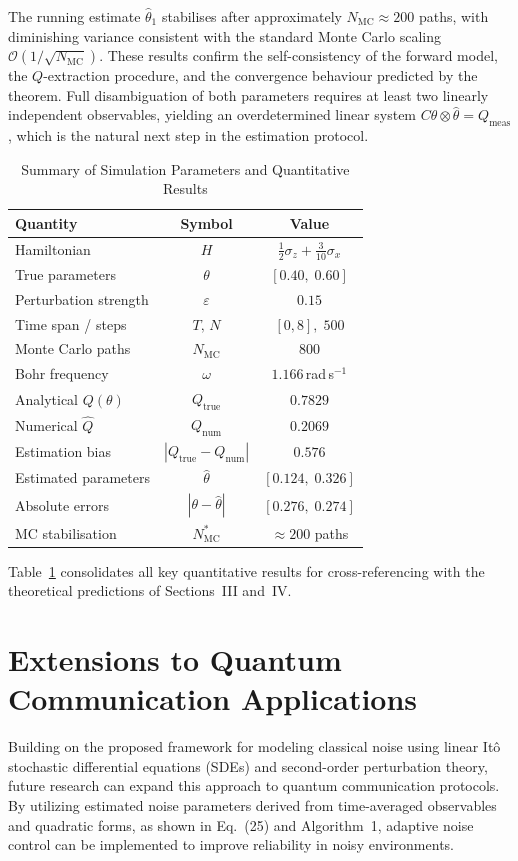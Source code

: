 \documentclass[journal,twocolumn]{IEEEtran}
\begin{document}
The running estimate $\hat\theta_1$ stabilises after approximately
$N_{\mathrm{MC}}\approx 200$ paths, with diminishing variance
consistent with the standard Monte Carlo scaling
$\mathcal{O}(1/\!\sqrt{N_{\mathrm{MC}}})$. These results confirm
the self-consistency of the forward model, the $Q$-extraction
procedure, and the convergence behaviour predicted by the theorem.
Full disambiguation of both parameters requires at least two linearly
independent observables, yielding an overdetermined linear system
$C\hat\theta\otimes\hat\theta = Q_{\mathrm{meas}}$, which is the
natural next step in the estimation protocol.

\begin{table}[!ht]
  \renewcommand{\arraystretch}{1.25}
  \caption{Summary of Simulation Parameters and Quantitative Results}
  \label{tab:results}
  \centering
  \begin{tabular}{lcc}
  \hline
  \textbf{Quantity} & \textbf{Symbol} & \textbf{Value} \\
  \hline
  Hamiltonian & $H$ & $\tfrac{1}{2}\sigma_z+\tfrac{3}{10}\sigma_x$ \\
  True parameters & $\theta$ & $[0.40,\;0.60]$ \\
  Perturbation strength & $\varepsilon$ & $0.15$ \\
  Time span / steps & $T,\,N$ & $[0,8],\;500$ \\
  Monte Carlo paths & $N_{\mathrm{MC}}$ & $800$ \\
  Bohr frequency & $\omega$ & $1.166$\,rad\,s$^{-1}$ \\
  Analytical $Q(\theta)$ & $Q_{\mathrm{true}}$ & $0.7829$ \\
  Numerical $\hat{Q}$ & $Q_{\mathrm{num}}$ & $0.2069$ \\
  Estimation bias & $|Q_{\mathrm{true}}-Q_{\mathrm{num}}|$ & $0.576$ \\
  Estimated parameters & $\hat\theta$ & $[0.124,\;0.326]$ \\
  Absolute errors & $|\theta-\hat\theta|$ & $[0.276,\;0.274]$ \\
  MC stabilisation & $N_{\mathrm{MC}}^*$ & $\approx 200$ paths \\
  \hline
  \end{tabular}
\end{table}

Table~\ref{tab:results} consolidates all key quantitative results for
cross-referencing with the theoretical predictions of Sections~III
and~IV.

\section{Extensions to Quantum Communication Applications}
Building on the proposed framework for modeling classical noise using linear It\^{o} stochastic differential equations (SDEs) and second-order perturbation theory, future research can expand this approach to quantum communication protocols. By utilizing estimated noise parameters derived from time-averaged observables and quadratic forms, as shown in Eq.~(25) and Algorithm~1, adaptive noise control can be implemented to improve reliability in noisy environments.
\end{document}
